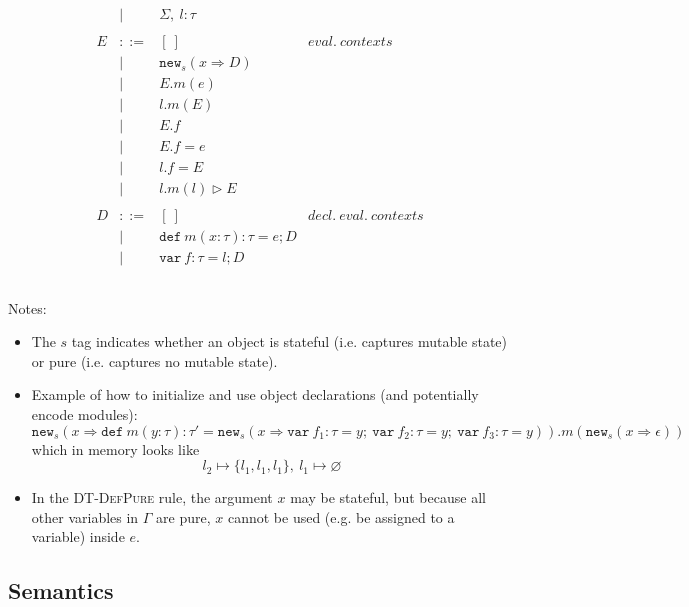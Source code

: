 \documentclass{llncs}
\newcommand{\keywadj}[1]{\mathtt{#1}}
\newcommand{\keyw}[1]{\keywadj{#1}~}
\begin{document}
\[\begin{array}{lll}
\begin{array}{lllr}
& | & \Sigma,~l : \tau\\
&&\\
E & ::= & [~] & eval.~ contexts\\
  & |   & \keywadj{new}_{s}(x \Rightarrow D) \\
  & |   & E.m(e)\\
  & |   & l.m(E)\\
  & |   & E.f \\
  & |   & E.f = e \\
  & |   & l.f = E \\
  & |   & l.m(l) \rhd E \\
&&\\
D & ::= & [~] & decl.~eval.~ contexts\\
  & |   & \keyw{def} m(x:\tau):\tau = e; D \\
  & |   & \keyw{var} f:\tau = l; D \\
&&\\
\end{array}
\end{array}
\]

\noindent Notes:

\begin{itemize}
\item The $s$ tag indicates whether an object is stateful (i.e. captures mutable state) or pure (i.e. captures no mutable state).
\item Example of how to initialize and use object declarations (and potentially encode modules):
\[
\keywadj{new}_{s}(x \Rightarrow \keyw{def} m(y : \tau) : \tau' = \keywadj{new}_{s}(x \Rightarrow \keyw{var} f_1 : \tau = y;~\keyw{var} f_2 : \tau = y;~\keyw{var} f_3 : \tau = y)).m(\keywadj{new}_{s} (x \Rightarrow \epsilon))
\]
which in memory looks like 
\[
l_2 \mapsto \{l_1,l_1,l_1\},~l_1 \mapsto \varnothing
\]
\item In the \textsc{DT-DefPure} rule, the argument $x$ may be stateful, but because all other variables in $\Gamma$ are pure, $x$ cannot be used (e.g. be assigned to a variable) inside $e$.
\end{itemize}


\newpage

\subsection{Semantics}
\end{document}
